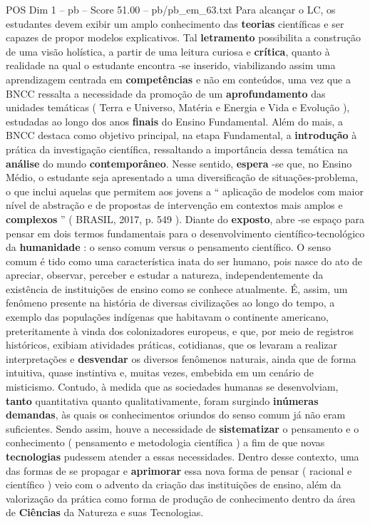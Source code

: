 \begin{textsample}{POS Dim 1 – pb – Score 51.00 – pb/pb\_em\_63.txt}
Para alcançar o LC, os estudantes devem exibir um amplo conhecimento das \textbf{teorias} científicas e ser capazes de propor modelos explicativos.
Tal \textbf{letramento} possibilita a construção de uma visão holística, a partir de uma leitura curiosa e \textbf{crítica}, quanto à realidade na qual o estudante encontra -se inserido, viabilizando assim uma aprendizagem centrada em \textbf{competências} e não em conteúdos, uma vez que a BNCC ressalta a necessidade da promoção de um \textbf{aprofundamento} das unidades temáticas ( Terra e Universo, Matéria e Energia e Vida e Evolução ), estudadas ao longo dos anos \textbf{finais} do Ensino Fundamental.
Além do mais, a BNCC destaca como objetivo principal, na etapa Fundamental, a \textbf{introdução} à prática da investigação científica, ressaltando a importância dessa temática na \textbf{análise} do mundo \textbf{contemporâneo}.
Nesse sentido, \textbf{espera} -se que, no Ensino Médio, o estudante seja apresentado a uma diversificação de situações-problema, o que inclui aquelas que permitem aos jovens a “ aplicação de modelos com maior nível de abstração e de propostas de intervenção em contextos mais amplos e \textbf{complexos} ” ( BRASIL, 2017, p. 549 ).
Diante do \textbf{exposto}, abre -se espaço para pensar em dois termos fundamentais para o desenvolvimento científico-tecnológico da \textbf{humanidade} : o senso comum versus o pensamento científico.
O senso comum é tido como uma característica inata do ser humano, pois nasce do ato de apreciar, observar, perceber e estudar a natureza, independentemente da existência de instituições de ensino como se conhece atualmente.
É, assim, um fenômeno presente na história de diversas civilizações ao longo do tempo, a exemplo das populações indígenas que habitavam o continente americano, preteritamente à vinda dos colonizadores europeus, e que, por meio de registros históricos, exibiam atividades práticas, cotidianas, que os levaram a realizar interpretações e \textbf{desvendar} os diversos fenômenos naturais, ainda que de forma intuitiva, quase instintiva e, muitas vezes, embebida em um cenário de misticismo.
Contudo, à medida que as sociedades humanas se desenvolviam, \textbf{tanto} quantitativa quanto qualitativamente, foram surgindo \textbf{inúmeras} \textbf{demandas}, às quais os conhecimentos oriundos do senso comum já não eram suficientes.
Sendo assim, houve a necessidade de \textbf{sistematizar} o pensamento e o conhecimento ( pensamento e metodologia científica ) a fim de que novas \textbf{tecnologias} pudessem atender a essas necessidades.
Dentro desse contexto, uma das formas de se propagar e \textbf{aprimorar} essa nova forma de pensar ( racional e científico ) veio com o advento da criação das instituições de ensino, além da valorização da prática como forma de produção de conhecimento dentro da área de \textbf{Ciências} da Natureza e suas Tecnologias.

\end{textsample}
